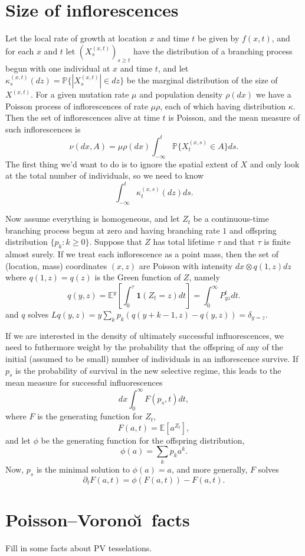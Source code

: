 \documentclass{article}
\renewcommand{\P}{\mathbb{P}}
\newcommand{\E}{\mathbb{E}}
\newcommand{\one}{\mathbf{1}}
\begin{document}
\section{Size of inflorescences}

Let the local rate of growth at location $x$ and time $t$ be given by $f(x,t)$,
and for each $x$ and $t$ let $(X^{(x,t)}_{s})_{s \ge t}$ have the distribution of a branching process begun with one individual at $x$ and time $t$,
and let $\kappa^{(x,t)}_s(dz) = \P\{ |X^{(x,t)}_s| \in dz \}$  be the marginal distribution of the size of $X^{(x,t)}$.
For a given mutation rate $\mu$ and population density $\rho(dx)$ we have a Poisson process of inflorescences of rate $\mu \rho$,
each of which having distribution $\kappa$.  
Then the set of inflorescences alive at time $t$ is Poisson, 
and the mean measure of such inflorescences is
\[ \nu(dx,A) = \mu \rho(dx) \int_{-\infty}^t \P\{ X^{(x,s)}_t \in A \} ds .\]
The first thing we'd want to do is to ignore the spatial extent of $X$ and only look at the total number of individuals,
so we need to know
\[ \int_{-\infty}^t \kappa^{(x,s)}_t(dz) ds . \]

Now assume everything is homogeneous, and let $Z_t$ be a continuous-time branching process begun at zero 
and having branching rate $1$ and offspring distribution $\{p_k : k\ge 0\}$.
Suppose that $Z$ has total lifetime $\tau$ and that $\tau$ is finite almost surely.
If we treat each inflorescence as a point mass, then the set of (location, mass) coordinates $(x,z)$
are Poisson with intensity $dx \otimes q(1,z) dz$ where $q(1,z)=q(z)$ is the Green function of $Z$, namely
\[  
  q(y,z) = \E^y \left[ \int_0^\tau \one(Z_t = z) dt \right] = \int_0^\infty P^t_{yz} dt .
\]
and $q$ solves $L q(y,z) = y \sum_k p_k (q(y+k-1,z)-q(y,z)) = \delta_{y=z}$.

If we are interested in the density of ultimately successful influorescences,
we need to futhermore weight by the probability that the offspring of any of the initial (assumed to be small) number of individuals in an inflorescence survive.
If $p_s$ is the probability of survival in the new selective regime,
this leads to the mean measure for successful influorescences
\[
   dx \int_0^\infty F(p_s,t) dt ,
\]
where $F$ is the generating function for $Z_t$,
\[
  F(a,t) = \E[a^{Z_t}] ,
\]
and let $\phi$ be the generating function for the offspring distribution,
\[
  \phi(a) = \sum_k p_k a^k .
\]
Now, $p_s$ is the minimal solution to $\phi(a) = a$,
and more generally, $F$ solves
\[
   \partial_t F(a,t) = \phi(F(a,t)) - F(a,t).
\]

\section{Poisson--Vorono\u\i\ facts}

Fill in some facts about PV tesselations.
\end{document}
